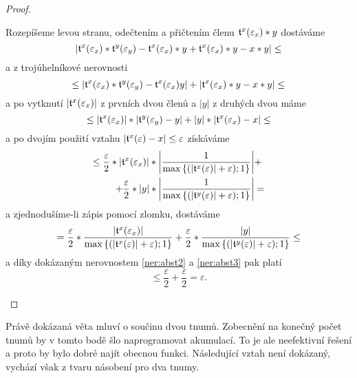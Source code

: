 \begin{theorem}
\begin{proof}
\begin{itemize}
{Rozepíšeme levou stranu, odečtením a přičtením členu $\mathfrak{t}^{x}(\varepsilon_x)*y$ dostáváme
\begin{equation}
|\mathfrak{t}^{x}(\varepsilon_x)*\mathfrak{t}^{y}(\varepsilon_y) - \mathfrak{t}^{x}(\varepsilon_x)*y + \mathfrak{t}^{x}(\varepsilon_x)*y - x*y|\leq
\end{equation}
a z trojúhelníkové nerovnosti
\begin{equation}
\leq|\mathfrak{t}^{x}(\varepsilon_x)*\mathfrak{t}^{y}(\varepsilon_y) - \mathfrak{t}^{x}(\varepsilon_x)y |+| \mathfrak{t}^{x}(\varepsilon_x)*y - x*y|\leq
\end{equation}
a po vytknutí $|\mathfrak{t}^{x}(\varepsilon_x)|$ z prvních dvou členů a $|y|$ z druhých dvou máme
\begin{equation}
\leq|\mathfrak{t}^{x}(\varepsilon_x)|*|\mathfrak{t}^{y}(\varepsilon_y) - y|+|y|*|\mathfrak{t}^{x}(\varepsilon_x) - x|\leq
\end{equation}
a po dvojím použití vztahu $|\mathfrak{t}^{x}(\varepsilon)-x|\leq\varepsilon$ získáváme
\begin{equation}
\begin{aligned}
\leq\frac{\varepsilon}{2}*|\mathfrak{t}^{x}(\varepsilon_x)|*\left|\frac{1}{\mathrm{max}\left\{(|\mathfrak{t}^{x}(\varepsilon)| + \varepsilon);1\right\}}\right|&+\\+\frac{\varepsilon}{2}*|y|*\left|\frac{1}{\mathrm{max}\left\{(|\mathfrak{t}^{y}(\varepsilon)| + \varepsilon);1\right\}}\right|&=
\end{aligned}
\end{equation}
a zjednodušíme-li zápis pomocí zlomku, dostáváme
\begin{equation}
= \frac{\varepsilon}{2}*\frac{\left|\mathfrak{t}^{x}(\varepsilon_x)\right|}{\mathrm{max}\left\{(|\mathfrak{t}^{x}(\varepsilon)| + \varepsilon);1\right\}}+\frac{\varepsilon}{2}*\frac{|y|}{\mathrm{max}\left\{(|\mathfrak{t}^{y}(\varepsilon)| + \varepsilon);1\right\}}\leq
\end{equation}
a díky dokázaným nerovnostem \eqref{ner:abst2} a \eqref{ner:abst3} pak platí
\begin{equation}
\leq\frac{\varepsilon}{2}+\frac{\varepsilon}{2}=\varepsilon.
\end{equation}}
\end{itemize}
\end{proof}
\end{theorem}

Právě dokázaná věta mluví o součinu dvou tnumů. Zobecnění na konečný počet tnumů by v tomto bodě šlo naprogramovat akumulací. To je ale neefektivní řešení a proto by bylo dobré najít obecnou funkci. Následující vztah není dokázaný, vychází však z tvaru násobení pro dva tnumy.

